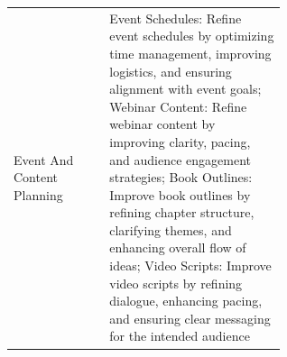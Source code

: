 \begin{longtable}{>{\raggedright\arraybackslash}p{0.2\linewidth}
                  >{\raggedright\arraybackslash}p{0.4\linewidth}}
{    FAQs: Refine Frequently Asked Questions (FAQ) sections by improving clarity, addressing common concerns, and simplifying explanations
} \\
\midrule
Event And Content Planning & \parbox[t]{\linewidth}{
    Event Schedules: Refine event schedules by optimizing time management, improving logistics, and ensuring alignment with event goals;\newline\newline
    Webinar Content: Refine webinar content by improving clarity, pacing, and audience engagement strategies;\newline\newline
    Book Outlines: Improve book outlines by refining chapter structure, clarifying themes, and enhancing overall flow of ideas;\newline\newline
    Video Scripts: Improve video scripts by refining dialogue, enhancing pacing, and ensuring clear messaging for the intended audience
} \\

\end{longtable}


